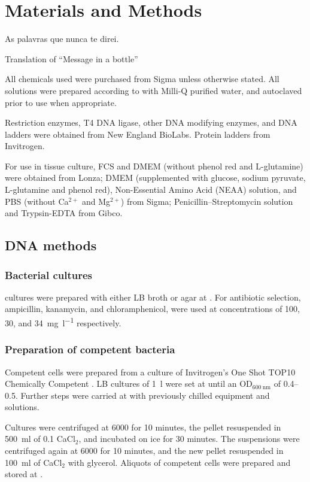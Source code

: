 \chapter{Materials and Methods}
\label{ch:methods}

  \epigraph{As palavras que nunca te direi.}{Translation of ``Message in a bottle''}
  \noindent

  All chemicals used were purchased from Sigma unless otherwise stated. All
  solutions were prepared according to  with Milli-Q
  purified water, and autoclaved prior to use when appropriate.

  Restriction enzymes, T4 DNA ligase, other DNA modifying enzymes, and DNA
  ladders were obtained from New England BioLabs. Protein ladders from Invitrogen.

  For use in tissue culture, FCS and DMEM (without phenol red and L-glutamine)
  were obtained from Lonza; DMEM (supplemented with glucose, sodium pyruvate,
  L-glutamine and phenol red), Non-Essential Amino Acid (NEAA) solution, and
  PBS (without Ca$^{2+}$ and Mg$^{2+}$) from Sigma; Penicillin--Streptomycin
  solution and Trypsin-EDTA from Gibco.

  \section{DNA methods}
    \subsection{Bacterial cultures}
       cultures were prepared with either LB broth or agar
      at . For antibiotic selection, ampicillin, kanamycin, and
      chloramphenicol, were used at concentrations of 100, 30,
      and \SI{34}{\mg\per\l} respectively.

    \subsection{Preparation of competent bacteria}
      Competent  cells were prepared from a culture of
      Invitrogen's One Shot TOP10 Chemically Competent . LB
      cultures of \SI{1}{\l} were set at  until an OD$_{\SI{600}{\nm}}$
      of \numrange{0.4}{0.5}. Further steps were carried at  with
      previously chilled equipment and solutions.

      Cultures were centrifuged at \SI{6000}{\gn} for 10 minutes, the
      pellet resuspended in \SI{500}{\ml} of \SI{0.1}{\mM} CaCl$_2$, and
      incubated on ice for 30 minutes. The suspensions were centrifuged
      again at \SI{6000}{\gn} for 10 minutes, and the new pellet resuspended in
      \SI{100}{\ml} of CaCl$_2$ with  glycerol. Aliquots of
      competent cells were prepared and stored at .

